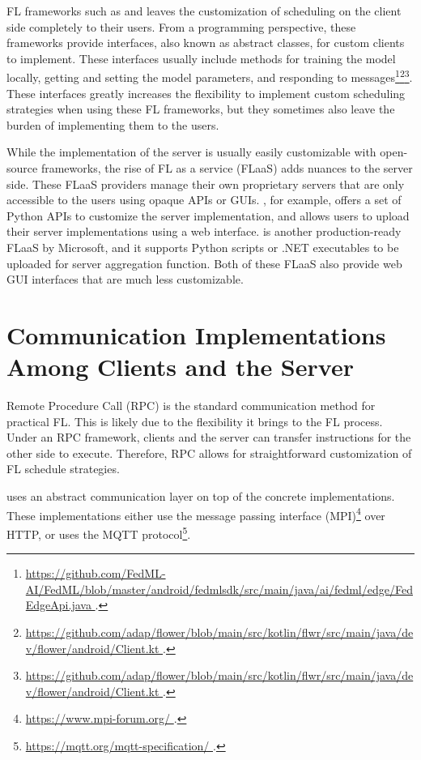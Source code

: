 \documentclass[conference]{IEEEtran}
\begin{document}
FL frameworks such as \FedML{} and
\Flower{} leaves the customization of
scheduling on the client side completely to their users.
From a programming perspective,
these frameworks provide interfaces,
also known as abstract classes,
for custom clients to implement.
These interfaces usually include methods for
training the model locally,
getting and setting the model parameters,
and responding to messages\footnote{\url{
    https://github.com/FedML-AI/FedML/blob/master/android/fedmlsdk/src/main/java/ai/fedml/edge/FedEdgeApi.java
}.}\footnote{\url{
    https://github.com/adap/flower/blob/main/src/kotlin/flwr/src/main/java/dev/flower/android/Client.kt
}.}\footnote{\url{
    https://github.com/adap/flower/blob/main/src/kotlin/flwr/src/main/java/dev/flower/android/Client.kt
}.}.
These interfaces greatly increases the flexibility to
implement custom scheduling strategies when using these FL frameworks,
but they sometimes also leave the burden of implementing them to the users.

While the implementation of the server is usually easily customizable with
open-source frameworks,
the rise of FL as a service (FLaaS)
adds nuances to the server side.
These FLaaS providers manage their own proprietary servers that
are only accessible to the users using opaque APIs or GUIs.
\FedML{}, for example,
offers a set of Python APIs to customize the server implementation,
and allows users to upload their server implementations using a web interface.
\Florida{} is another production-ready FLaaS by Microsoft,
and it supports Python scripts or .NET executables to be uploaded for
server aggregation function.
Both of these FLaaS also provide web GUI interfaces that
are much less customizable.

\section{Communication Implementations Among Clients and the Server}

\label{sec:communication}

Remote Procedure Call (RPC) is the standard communication method for
practical FL.
This is likely due to the flexibility it brings to the FL process.
Under an RPC framework,
clients and the server can transfer instructions for the other side to execute.
Therefore, RPC allows for straightforward customization of
FL schedule strategies.

\FedML{} uses an abstract communication layer on top of
the concrete implementations.
These implementations either use the message passing interface
(MPI)\footnote{\url{
    https://www.mpi-forum.org/
}.} over HTTP,
or uses the MQTT protocol\footnote{\url{
    https://mqtt.org/mqtt-specification/
}.}.
\end{document}
